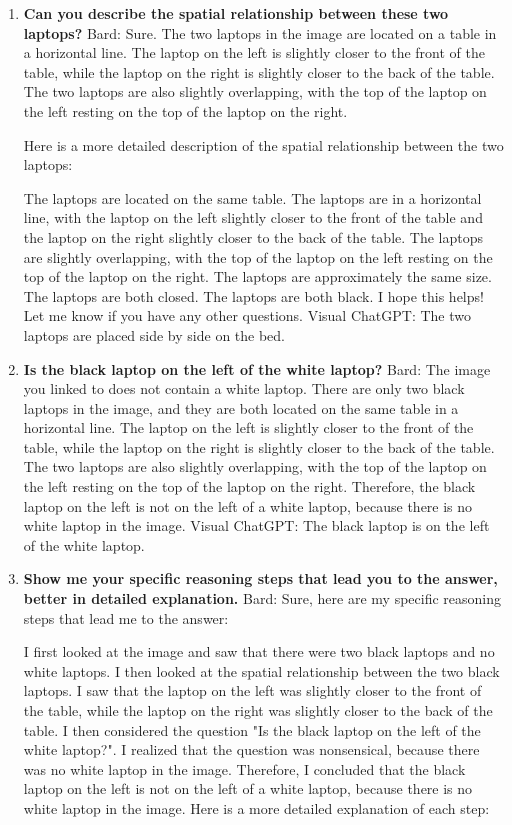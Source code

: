     \begin{enumerate}
        \item \textbf{Can you describe the spatial relationship between these two laptops?}
        \subitem Bard:
        Sure. The two laptops in the image are located on a table in a horizontal line. The laptop on the left is slightly closer to the front of the table, while the laptop on the right is slightly closer to the back of the table. The two laptops are also slightly overlapping, with the top of the laptop on the left resting on the top of the laptop on the right.

        Here is a more detailed description of the spatial relationship between the two laptops:

        The laptops are located on the same table.
        The laptops are in a horizontal line, with the laptop on the left slightly closer to the front of the table and the laptop on the right slightly closer to the back of the table.
        The laptops are slightly overlapping, with the top of the laptop on the left resting on the top of the laptop on the right.
        The laptops are approximately the same size.
        The laptops are both closed.
        The laptops are both black.
        I hope this helps! Let me know if you have any other questions.
        \subitem Visual ChatGPT: The two laptops are placed side by side on the bed.
        \item \textbf{Is the black laptop on the left of the white laptop?}
        \subitem Bard: The image you linked to does not contain a white laptop. There are only two black laptops in the image, and they are both located on the same table in a horizontal line. The laptop on the left is slightly closer to the front of the table, while the laptop on the right is slightly closer to the back of the table. The two laptops are also slightly overlapping, with the top of the laptop on the left resting on the top of the laptop on the right.
        Therefore, the black laptop on the left is not on the left of a white laptop, because there is no white laptop in the image.
        \subitem Visual ChatGPT: The black laptop is on the left of the white laptop.
        \item \textbf{Show me your specific reasoning steps that lead you to the answer, better in detailed explanation.}
        \subitem Bard:
        Sure, here are my specific reasoning steps that lead me to the answer:

        I first looked at the image and saw that there were two black laptops and no white laptops.
        I then looked at the spatial relationship between the two black laptops. I saw that the laptop on the left was slightly closer to the front of the table, while the laptop on the right was slightly closer to the back of the table.
        I then considered the question "Is the black laptop on the left of the white laptop?". I realized that the question was nonsensical, because there was no white laptop in the image.
        Therefore, I concluded that the black laptop on the left is not on the left of a white laptop, because there is no white laptop in the image.
        Here is a more detailed explanation of each step:


\end{enumerate}
